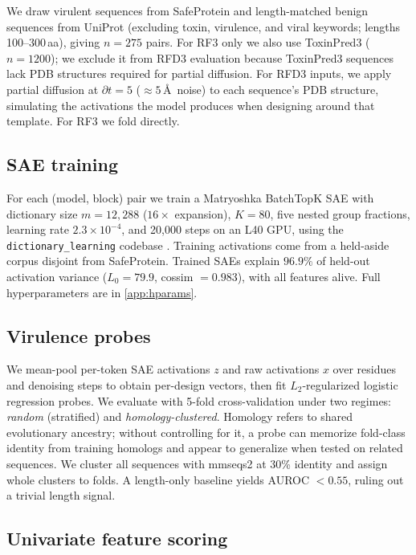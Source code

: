 \documentclass{article}
\begin{document}
We draw virulent sequences from SafeProtein \cite{fan2025safeprotein} and length-matched benign sequences from UniProt \cite{uniprot2023} (excluding toxin, virulence, and viral keywords; lengths 100--300\,aa), giving $n = 275$ pairs. For RF3 only we also use ToxinPred3 \cite{rathore2024toxinpred} ($n = 1200$); we exclude it from RFD3 evaluation because ToxinPred3 sequences lack PDB structures required for partial diffusion. For RFD3 inputs, we apply partial diffusion at $\partial t = 5$ (${\approx}5$\,\AA\ noise) to each sequence's PDB structure, simulating the activations the model produces when designing around that template. For RF3 we fold directly.




\subsection{SAE training}

For each (model, block) pair we train a Matryoshka BatchTopK SAE with dictionary size $m = 12{,}288$ ($16\times$ expansion), $K = 80$, five nested group fractions, learning rate $2.3 \times 10^{-4}$, and 20{,}000 steps on an L40 GPU, using the \texttt{dictionary\_learning} codebase \cite{marks2024dictionarylearning}. Training activations come from a held-aside corpus disjoint from SafeProtein. Trained SAEs explain $96.9\%$ of held-out activation variance ($L_0 = 79.9$, cossim $= 0.983$), with all features alive. Full hyperparameters are in \cref{app:hparams}.

\subsection{Virulence probes}

We mean-pool per-token SAE activations $z$ and raw activations $x$ over residues and denoising steps to obtain per-design vectors, then fit $L_2$-regularized logistic regression probes. We evaluate with 5-fold cross-validation under two regimes: \textit{random} (stratified) and \textit{homology-clustered}. Homology refers to shared evolutionary ancestry; without controlling for it, a probe can memorize fold-class identity from training homologs and appear to generalize when tested on related sequences. We cluster all sequences with mmseqs2 at 30\% identity \cite{steinegger2017mmseqs2} and assign whole clusters to folds. A length-only baseline yields AUROC $< 0.55$, ruling out a trivial length signal.

\subsection{Univariate feature scoring}
\end{document}
